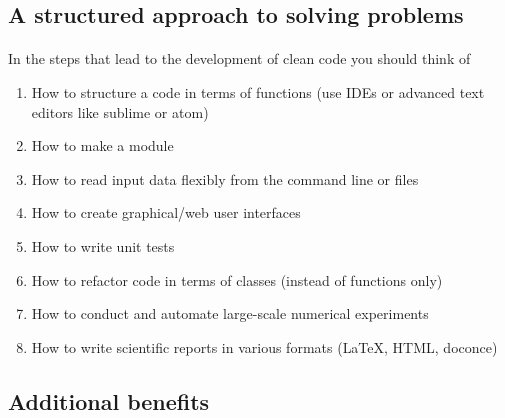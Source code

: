 \noindent



\subsection*{A structured approach to solving problems}

\paragraph{}
In the steps that lead to the development of clean code you should  think of 
\begin{enumerate}
  \item How to structure a code in terms of functions  (use IDEs or advanced text editors like sublime or atom)

  \item How to make a module

  \item How to read input data flexibly from the command line or files

  \item How to create graphical/web user interfaces

  \item How to write unit tests  

  \item How to refactor code in terms of classes (instead of functions only)

  \item How to conduct and automate large-scale numerical experiments

  \item How to write scientific reports in various formats ({\LaTeX}, HTML, doconce)
\end{enumerate}

\noindent



\subsection*{Additional benefits}

